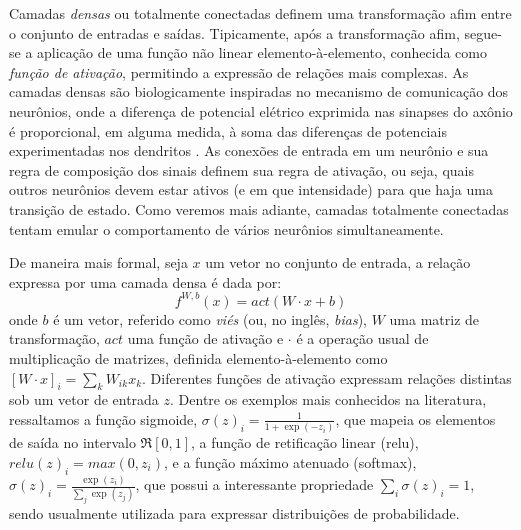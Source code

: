 Camadas \textit{densas} ou totalmente conectadas definem uma transformação afim entre o conjunto de entradas e saídas. Tipicamente, após a transformação afim, segue-se a aplicação de uma função não linear elemento-à-elemento, conhecida como \textit{função de ativação}, permitindo a expressão de relações mais complexas. As camadas densas são biologicamente inspiradas no mecanismo de comunicação dos neurônios, onde a diferença de potencial elétrico exprimida nas sinapses do axônio é proporcional, em alguma medida, à soma das diferenças de potenciais experimentadas nos dendritos \cite{GerstnerNeuronalDynamics}. As conexões de entrada em um neurônio e sua regra de composição dos sinais definem sua regra de ativação, ou seja, quais outros neurônios devem estar ativos (e em que intensidade) para que haja uma transição de estado. Como veremos mais adiante, camadas totalmente conectadas tentam emular o comportamento de vários neurônios simultaneamente.

De maneira mais formal, seja $x$ um vetor no conjunto de entrada, a relação expressa por uma camada densa é dada por:
\begin{equation}\label{denseop}
f^{W,b}(x) = act(W \cdot x + b)
\end{equation}
onde $b$ é um vetor, referido como \textit{viés} (ou, no inglês, \textit{bias}), $W$ uma matriz de transformação, $act$ uma função de ativação e $\cdot$ é a operação usual de multiplicação de matrizes, definida elemento-à-elemento como $[W \cdot x]_{i} = \sum_k W_{ik} x_k$. Diferentes funções de ativação expressam relações distintas sob um vetor de entrada $z$. Dentre os exemplos mais conhecidos na literatura, ressaltamos a função sigmoide, $\sigma(z)_i = \frac{1}{1+\exp(-z_i)}$, que mapeia os elementos de saída no intervalo $\Re[0,1]$, a função de retificação linear (relu), $relu(z)_i = max(0, z_i)$, e a função máximo atenuado (softmax), $\sigma(z)_i = \frac{\exp(z_i)}{\sum_j \exp(z_j)}$, que possui a interessante propriedade $\sum_i \sigma(z)_i = 1$, sendo usualmente utilizada para expressar distribuições de probabilidade.

